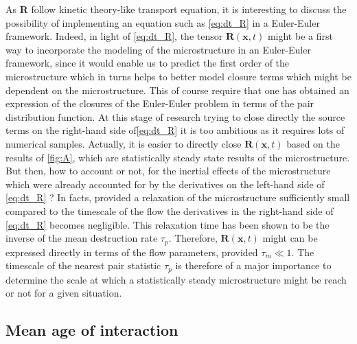 As \textbf{R} follow kinetic theory-like transport equation, it is interesting to discuss the possibility of implementing an equation such as \ref{eq:dt_R} in a Euler-Euler framework. 
Indeed, in light of \ref{eq:dt_R}, the tensor $\textbf{R}(\textbf{x},t)$ might be a first way to incorporate the modeling of the microstructure in an Euler-Euler framework, since it would enable us to predict the first order of the microstructure which in turns helps to better model closure terms which might be dependent on the microstructure. 
This of course require that one has obtained an expression of the closures of the Euler-Euler problem in terms of the pair distribution function. 
At this stage of research trying to close directly the source terms on the right-hand side of\ref{eq:dt_R} it is too ambitious as it requires lots of numerical samples. 
Actually, it is easier to directly close $\textbf{R}(\textbf{x},t)$ based on the results of \ref{fig:A}, which are statistically steady state results of the microstructure. 
But then, how to account or not, for the inertial effects of the microstructure which were already accounted for by the derivatives on the left-hand side of \ref{eq:dt_R} ? 
In facts, provided a relaxation of the microstructure sufficiently small compared to the timescale of the flow the derivatives in the right-hand side of \ref{eq:dt_R} becomes negligible.
This relaxation time has been shown to be the inverse of the mean destruction rate $\tau_p$.  
Therefore, $\textbf{R}(\textbf{x},t)$ might can be expressed directly in terms of the flow parameters, provided $\tau_m \ll 1$. 
The timescale of the nearest pair statistic $\tau_p$ is therefore of a major importance to determine the scale at which a statistically steady microstructure might be reach or not for a given situation.


\subsection{Mean age of interaction}

